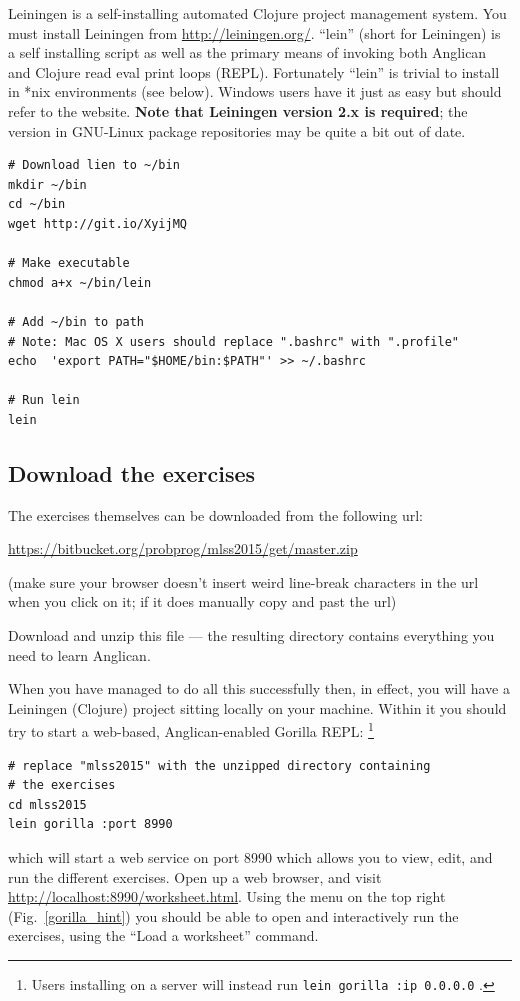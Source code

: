 \documentclass{article}
\begin{document}
Leiningen is a self-installing automated Clojure project management system.  
You must install Leiningen from \url{http://leiningen.org/}.  ``lein'' 
(short for Leiningen) is a self installing script as well as the primary means
of invoking both Anglican and Clojure read eval print loops (REPL).  Fortunately
``lein'' is trivial to install in *nix environments (see below).  Windows
users have it just as easy but should refer to the website.
\textbf{ Note that Leiningen version 2.x is required}; the version in  
GNU-Linux package repositories may be quite a bit out of date.

\begin{verbatim}
# Download lien to ~/bin
mkdir ~/bin
cd ~/bin
wget http://git.io/XyijMQ

# Make executable
chmod a+x ~/bin/lein

# Add ~/bin to path
# Note: Mac OS X users should replace ".bashrc" with ".profile"
echo  'export PATH="$HOME/bin:$PATH"' >> ~/.bashrc 

# Run lein
lein
\end{verbatim}

\subsection{Download the exercises}

The exercises themselves can be downloaded from the following url:

\url{https://bitbucket.org/probprog/mlss2015/get/master.zip}

\noindent (make sure your browser doesn't insert weird line-break characters in the url when you click on it; if it does manually copy and past the url)

Download and unzip this file --- the resulting directory contains everything you need to learn Anglican.

When you have managed to do all this successfully then, in effect, you will have a 
Leiningen (Clojure) project sitting locally on your machine.   Within it  
you should try to start a web-based, Anglican-enabled Gorilla REPL:
\footnote{Users installing on a server will instead run \texttt{lein gorilla :ip 0.0.0.0} .}

\begin{verbatim}
# replace "mlss2015" with the unzipped directory containing
# the exercises
cd mlss2015
lein gorilla :port 8990
\end{verbatim}
which will start a web service on port 8990 which allows you to view, edit, and run
the different exercises.
Open up a web browser, and visit \url{http://localhost:8990/worksheet.html}.
Using the menu on the top right (Fig.~\ref{gorilla_hint}) you should be able to open and interactively run the exercises,
using the ``Load a worksheet'' command.
\end{document}
